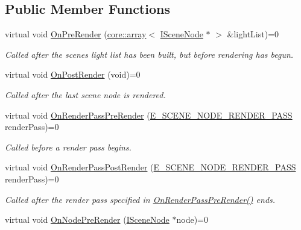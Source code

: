 \subsection*{Public Member Functions}
\begin{DoxyCompactItemize}
\item 
virtual void \hyperlink{classirr_1_1scene_1_1ILightManager_a060badf09dc2f8ba8ddb148034c27817}{On\+Pre\+Render} (\hyperlink{classirr_1_1core_1_1array}{core\+::array}$<$ \hyperlink{classirr_1_1scene_1_1ISceneNode}{I\+Scene\+Node} $\ast$ $>$ \&light\+List)=0
\begin{DoxyCompactList}\small\item\em Called after the scene\textquotesingle{}s light list has been built, but before rendering has begun. \end{DoxyCompactList}\item 
virtual void \hyperlink{classirr_1_1scene_1_1ILightManager_ac8f92f0fbd43ba9cb01b47647125a1a3}{On\+Post\+Render} (void)=0
\begin{DoxyCompactList}\small\item\em Called after the last scene node is rendered. \end{DoxyCompactList}\item 
virtual void \hyperlink{classirr_1_1scene_1_1ILightManager_a56eaec6a697659f40b4f29b681fbdfad}{On\+Render\+Pass\+Pre\+Render} (\hyperlink{namespaceirr_1_1scene_a7862269bd1abc123929d4dbb8200d67f}{E\+\_\+\+S\+C\+E\+N\+E\+\_\+\+N\+O\+D\+E\+\_\+\+R\+E\+N\+D\+E\+R\+\_\+\+P\+A\+SS} render\+Pass)=0
\begin{DoxyCompactList}\small\item\em Called before a render pass begins. \end{DoxyCompactList}\item 
virtual void \hyperlink{classirr_1_1scene_1_1ILightManager_a189edbf3a16ebb3c82e5d9f93dd2b41b}{On\+Render\+Pass\+Post\+Render} (\hyperlink{namespaceirr_1_1scene_a7862269bd1abc123929d4dbb8200d67f}{E\+\_\+\+S\+C\+E\+N\+E\+\_\+\+N\+O\+D\+E\+\_\+\+R\+E\+N\+D\+E\+R\+\_\+\+P\+A\+SS} render\+Pass)=0
\begin{DoxyCompactList}\small\item\em Called after the render pass specified in \hyperlink{classirr_1_1scene_1_1ILightManager_a56eaec6a697659f40b4f29b681fbdfad}{On\+Render\+Pass\+Pre\+Render()} ends. \end{DoxyCompactList}\item 
virtual void \hyperlink{classirr_1_1scene_1_1ILightManager_a23ae7bdf54613e6dd41d4138cb6f5edc}{On\+Node\+Pre\+Render} (\hyperlink{classirr_1_1scene_1_1ISceneNode}{I\+Scene\+Node} $\ast$node)=0

\end{DoxyCompactItemize}
